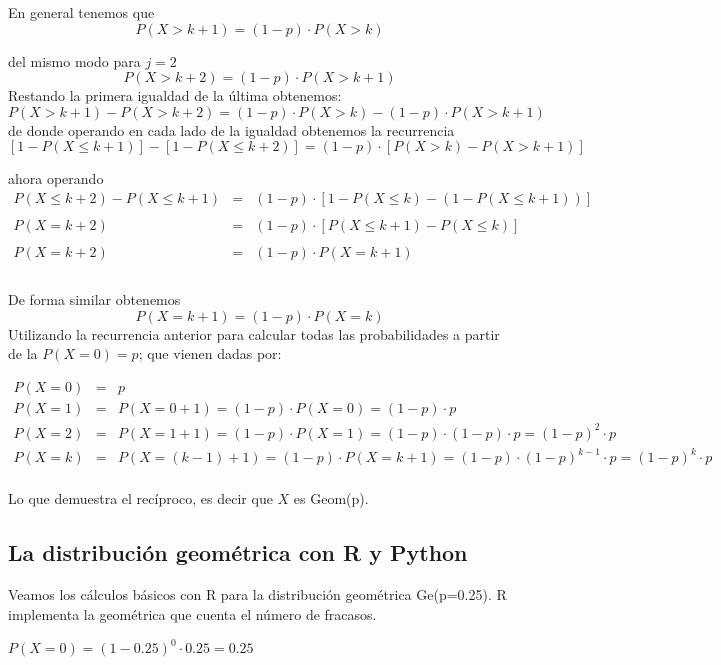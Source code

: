 \documentclass[
]{article}
\begin{document}
En general tenemos que \[P(X>k+1) = (1-p)\cdot P(X>k)\]

del mismo modo para \(j=2\) \[P(X>k+2) = (1-p)\cdot P(X>k+1)\] Restando
la primera igualdad de la última obtenemos:
\[P(X>k+1) - P(X>k+2) = (1-p)\cdot P(X>k) - (1-p)\cdot P(X>k+1)\] de
donde operando en cada lado de la igualdad obtenemos la recurrencia
\[\left[1-P(X\leq k+1)  \right] - \left[1-P(X\leq k+2)\right] = (1-p)\cdot \left[P(X>k)-P(X>k+1)\right]\]

ahora operando \[\begin{array}{rcl}
  P(X\leq k+2)-P(X\leq k+1)&=&(1-p)\cdot \left[ 1-P(X\leq k)-(1-P(X\leq k+1))\right]\\\\
  P(X=k+2)&=&(1-p)\cdot \left[P(X\leq k+1)-P(X\leq k)\right]\\\\
  P(X=k+2)&=&(1-p)\cdot P(X=k+1)\\\\
\end{array}\]

De forma similar obtenemos \[P(X=k+1) = (1-p)\cdot P(X=k)\] Utilizando
la recurrencia anterior para calcular todas las probabilidades a partir
de la \(P(X=0)=p\); que vienen dadas por:

\[\begin{array}{rcl}
  P(X=0)&=&p\\
  P(X=1)&=&P(X=0+1) = (1-p)\cdot P(X=0) = (1-p)\cdot p\\
  P(X=2)&=&P(X=1+1) = (1-p)\cdot P(X=1)=(1-p)\cdot (1-p)\cdot p = (1-p)^2\cdot p\\
  P(X=k)&=&P(X=(k-1)+1) = (1-p)\cdot P(X=k+1) = (1-p)\cdot (1-p)^{k-1}\cdot p = (1-p)^k \cdot p\\
\end{array}\]

Lo que demuestra el recíproco, es decir que \(X\) es Geom(p).

\hypertarget{la-distribuciuxf3n-geomuxe9trica-con-r-y-python}{%
\subsection{La distribución geométrica con R y
Python}\label{la-distribuciuxf3n-geomuxe9trica-con-r-y-python}}

Veamos los cálculos básicos con R para la distribución geométrica
Ge(p=0.25). R implementa la geométrica que cuenta el número de fracasos.

\(P(X=0) = (1-0.25)^0 \cdot 0.25 = 0.25\)
\end{document}
